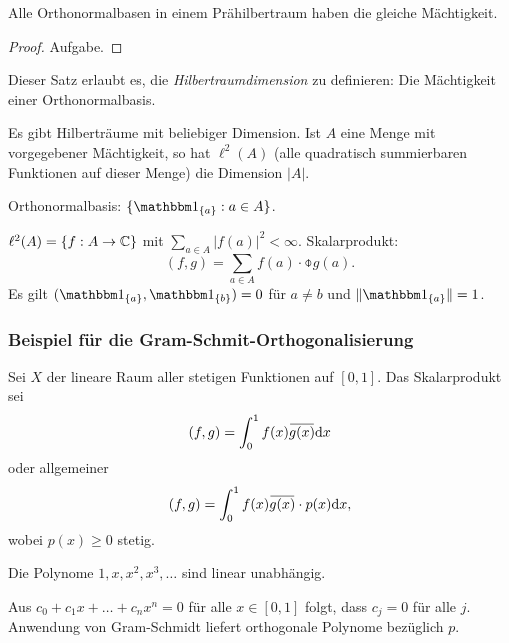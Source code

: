 \begin{thm} %
  Alle Orthonormalbasen in einem Prähilbertraum haben die gleiche Mächtigkeit.
\end{thm}

\begin{proof}
  Aufgabe.
\end{proof}

Dieser Satz erlaubt es, die \emph{Hilbertraumdimension} zu definieren: Die
Mächtigkeit einer Orthonormalbasis.

\begin{rmrk*}
  Es gibt Hilberträume mit beliebiger Dimension. Ist $A$ eine Menge mit
  vorgegebener Mächtigkeit, so hat $\ell^2(A)$ (alle quadratisch summierbaren
  Funktionen auf dieser Menge) die Dimension $|A|$.

  Orthonormalbasis: $\{ \ind_{\{a\}} : a \in A \}$.

  $\ell^2(A) = \{ f : A \to \mathbb{C} \}$ mit $\sum_{a \in A} |f(a)|^2 < \infty$.
  Skalarprodukt:
  \[ (f,g) = \sum_{a \in A} f(a) \cdot \obar{g(a)}. \]
  Es gilt $(\ind_{\{a\}}, \ind_{\{b\}}) = 0$ für $a \ne b$ und $\| \ind_{\{a\}} \|
  = 1$.
\end{rmrk*}

\subsubsection*{Beispiel für die Gram-Schmit-Orthogonalisierung}
Sei $X$ der lineare Raum aller stetigen Funktionen auf $[0,1]$. Das
Skalarprodukt sei
\[ (f,g) = \int_0^1 f(x) \obar{g(x)} \diffop x \]
oder allgemeiner
\[ (f,g) = \int_0^1 f(x) \obar{g(x)} \cdot p(x) \diffop x, \]
wobei $p(x) \ge 0$ stetig.

Die Polynome $1, x, x^2, x^3, \ldots$ sind linear unabhängig.

Aus $c_0 + c_1 x + \ldots + c_n x^n = 0$ für alle $x \in [0,1]$ folgt, dass $c_j
= 0$ für alle $j$. Anwendung von Gram-Schmidt liefert orthogonale Polynome
bezüglich $p$.